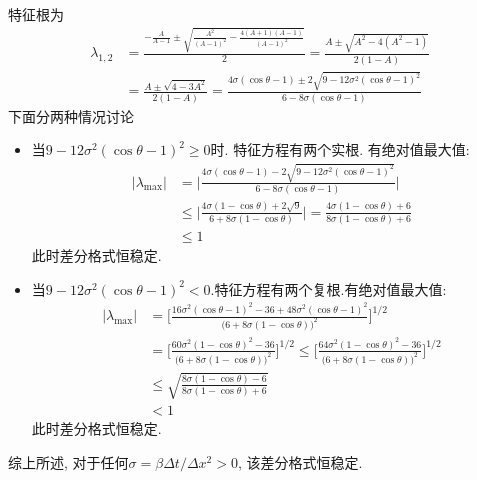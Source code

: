 \begin{solution}
\[\]
特征根为
\begin{align*}
\lambda_{1,2} & =\frac{-\frac{A}{A-1}\pm\sqrt{\frac{A^{2}}{(A-1)^{2}}-\frac{4(A+1)(A-1)}{(A-1)^{2}}}}{2}=\frac{A\pm\sqrt{A^{2}-4(A^{2}-1)}}{2(1-A)}\\
 & =\frac{A\pm\sqrt{4-3A^{2}}}{2(1-A)}=\frac{4\sigma(\cos\theta-1)\pm2\sqrt{9-12\sigma^{2}(\cos\theta-1)^{2}}}{6-8\sigma(\cos\theta-1)}
\end{align*}
下面分两种情况讨论
\begin{itemize}
\item 当$9-12\sigma^{2}(\cos\theta-1)^{2}\geq0$时. 特征方程有两个实根. 有绝对值最大值:
\begin{align*}
|\lambda_{\max}| & =\Bigg|\frac{4\sigma(\cos\theta-1)-2\sqrt{9-12\sigma^{2}(\cos\theta-1)^{2}}}{6-8\sigma(\cos\theta-1)}\Bigg|\\
 & \leq\Bigg|\frac{4\sigma(1-\cos\theta)+2\sqrt{9}}{6+8\sigma(1-\cos\theta)}\Bigg|=\frac{4\sigma(1-\cos\theta)+6}{8\sigma(1-\cos\theta)+6}\\
 & \leq1
\end{align*}
 此时差分格式恒稳定.
\item 当$9-12\sigma^{2}(\cos\theta-1)^{2}<0$.特征方程有两个复根.有绝对值最大值:
\begin{align*}
|\lambda_{\max}| & =\Bigg[\frac{16\sigma^{2}(\cos\theta-1)^{2}-36+48\sigma^{2}(\cos\theta-1)^{2}}{\big(6+8\sigma(1-\cos\theta)\big)^{2}}\Bigg]^{1/2}\\
 & =\Bigg[\frac{60\sigma^{2}(1-\cos\theta)^{2}-36}{\big(6+8\sigma(1-\cos\theta)\big)^{2}}\Bigg]^{1/2}\leq\Bigg[\frac{64\sigma^{2}(1-\cos\theta)^{2}-36}{\big(6+8\sigma(1-\cos\theta)\big)^{2}}\Bigg]^{1/2}\\
 & \leq\sqrt{\frac{8\sigma(1-\cos\theta)-6}{8\sigma(1-\cos\theta)+6}}\\
 & <1
\end{align*}
 此时差分格式恒稳定.
\end{itemize}
综上所述, 对于任何$\sigma=\beta\Delta t/\Delta x^{2}>0$, 该差分格式恒稳定.
\end{solution}
